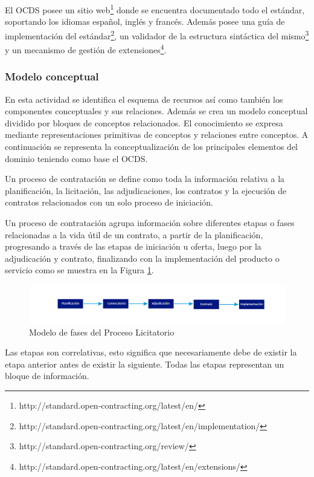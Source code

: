 El OCDS posee un sitio web\footnote{http://standard.open-contracting.org/latest/en/} donde se encuentra documentado todo el estándar, soportando los idiomas español, inglés y francés. Además posee una guía de implementación del estándar\footnote{http://standard.open-contracting.org/latest/en/implementation/}, un validador de la estructura sintáctica del mismo\footnote{http://standard.open-contracting.org/review/} y un mecanismo de gestión de extensiones\footnote{http://standard.open-contracting.org/latest/en/extensions/}.

\subsubsection{Modelo conceptual}

En esta actividad se identifica el esquema de recursos así como también los componentes conceptuales y sus relaciones. Además se crea un modelo conceptual dividido por bloques de conceptos relacionados. El conocimiento se expresa mediante representaciones primitivas de conceptos y relaciones entre conceptos. A continuación se representa la conceptualización de los principales elementos del dominio teniendo como base el OCDS.

Un proceso de contratación se define como toda la información relativa a la planificación, la licitación, las adjudicaciones, los contratos y la ejecución de contratos relacionados con un solo proceso de iniciación.

Un proceso de contratación agrupa información sobre diferentes etapas o fases relacionadas a la vida útil de un contrato, a partir de la planificación, progresando a través de las etapas de iniciación u oferta, luego por la adjudicación y contrato, finalizando con la implementación del producto o servicio como se muestra en la Figura \ref{img:fases del proceso licitatorio }.

\begin{figure}[!htbp]
    \centering
    \includegraphics[width=150mm]{figuras/Diagramas_ProcesoLicitatorio.png}
    \caption{Modelo de fases del Proceso Licitatorio}
    \label{img:fases del proceso licitatorio }
\end{figure}

Las etapas son correlativas, esto significa que necesariamente debe de existir la etapa anterior antes de existir la siguiente. Todas las etapas representan un bloque de información.

